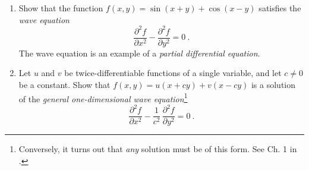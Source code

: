 \begin{enumerate}[\bfseries 1.]
[{[\bfseries 1.]}]
 \item Show that the function $f(x,y)=\sin(x+y) + \cos(x-y)$ satisfies the \emph{wave equation}
  \begin{displaymath}
   \frac{\partial^2 f}{\partial x^2} - \frac{\partial^2 f}{\partial y^2} = 0 ~.
  \end{displaymath}
  The wave equation is an example of a \emph{partial differential equation}.
 \item Let $u$ and $v$ be twice-differentiable functions of a single variable, and let $c\ne 0$ be a constant.
  Show that $f(x,y)=u(x+cy)+v(x-cy)$ is a
  solution of the \emph{general one-dimensional wave equation}\footnote{Conversely, it turns out that \emph{any}
  solution must be of this form. See Ch. 1 in \cite{wei}.}
  \begin{displaymath}
   \frac{\partial^2 f}{\partial x^2} - \frac{1}{c^2}\,\frac{\partial^2 f}{\partial y^2} = 0 ~.
  \end{displaymath}
\end{enumerate}
\newpage
